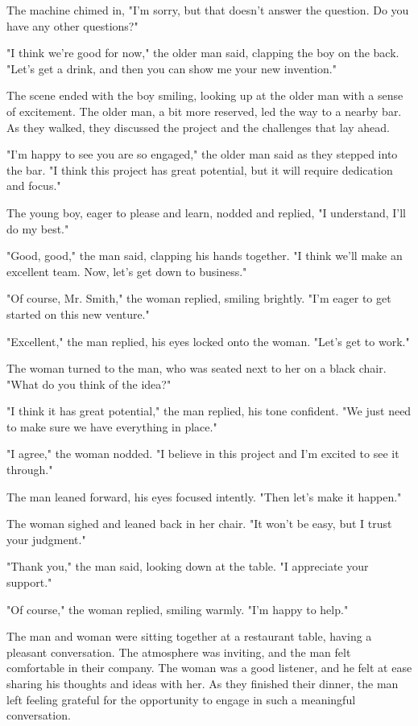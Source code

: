 \documentclass[smalldemyvopaper,11pt,twoside,onecolumn,openright,extrafontsizes]{memoir}
\begin{document}
The machine chimed in, "I'm sorry, but that doesn't answer the question. Do you have any other questions?"\par
"I think we're good for now," the older man said, clapping the boy on the back. "Let's get a drink, and then you can show me your new invention."\par
The scene ended with the boy smiling, looking up at the older man with a sense of excitement. The older man, a bit more reserved, led the way to a nearby bar. As they walked, they discussed the project and the challenges that lay ahead.\par
"I'm happy to see you are so engaged," the older man said as they stepped into the bar. "I think this project has great potential, but it will require dedication and focus."\par
The young boy, eager to please and learn, nodded and replied, "I understand, I'll do my best."\par
"Good, good," the man said, clapping his hands together. "I think we'll make an excellent team. Now, let's get down to business."\par
"Of course, Mr. Smith," the woman replied, smiling brightly. "I'm eager to get started on this new venture."\par
"Excellent," the man replied, his eyes locked onto the woman. "Let's get to work."\par
The woman turned to the man, who was seated next to her on a black chair. "What do you think of the idea?"\par
"I think it has great potential," the man replied, his tone confident. "We just need to make sure we have everything in place."\par
"I agree," the woman nodded. "I believe in this project and I'm excited to see it through."\par
The man leaned forward, his eyes focused intently. "Then let's make it happen."\par
The woman sighed and leaned back in her chair. "It won't be easy, but I trust your judgment."\par
"Thank you," the man said, looking down at the table. "I appreciate your support."\par
"Of course," the woman replied, smiling warmly. "I'm happy to help."\par
The man and woman were sitting together at a restaurant table, having a pleasant conversation. The atmosphere was inviting, and the man felt comfortable in their company. The woman was a good listener, and he felt at ease sharing his thoughts and ideas with her. As they finished their dinner, the man left feeling grateful for the opportunity to engage in such a meaningful conversation.\par
\end{document}
